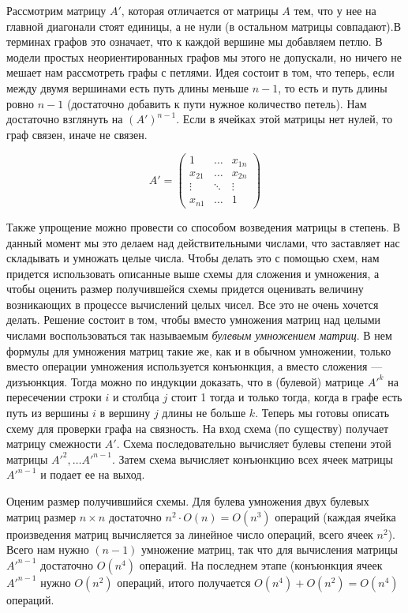 \documentclass[a4paper, 12pt]{article}
\begin{document}
Рассмотрим матрицу $A'$, которая отличается от матрицы $A$ тем, что у нее на главной диагонали стоят единицы, а не нули (в остальном
матрицы совпадают).В терминах графов это означает, что к каждой вершине мы добавляем петлю. В модели простых неориентированных графов мы этого не допускали, но ничего не мешает нам рассмотреть графы с петлями. Идея состоит в том, что теперь, если между двумя вершинами есть путь длины меньше $n - 1$, то есть и путь длины ровно $n - 1$ (достаточно добавить к пути нужное количество петель). Нам достаточно взглянуть на $(A')^{n - 1}$. Если в ячейках этой матрицы нет нулей, то граф связен, иначе не связен. 

\[A' = \begin{pmatrix} 1 & \ldots & x_{1n} \\ x_{21} & \ldots & x_{2n} \\ \vdots & \ddots & \vdots \\ x_{n1} & \ldots & 1 \end{pmatrix}\]

Также упрощение можно провести со способом возведения матрицы в степень. В данный момент мы это делаем над действительными числами, что заставляет нас складывать и умножать целые числа. Чтобы делать это с помощью схем, нам придется использовать описанные выше схемы для сложения и умножения, а чтобы оценить размер получившейся схемы придется оценивать величину возникающих в процессе
вычислений целых чисел. Все это не очень хочется делать. Решение состоит в том, чтобы вместо умножения матриц над целыми числами воспользоваться так называемым \textit{булевым умножением матриц}. В нем формулы для умножения матриц такие же, как и в обычном умножении, только вместо операции умножения используется конъюнкция, а вместо сложения --- дизъюнкция. Тогда можно по индукции доказать, что в (булевой) матрице $A'^k$ на пересечении строки $i$ и столбца $j$ стоит 1 тогда и только тогда, когда в графе есть путь из вершины $i$ в вершину $j$ длины не больше $k$. Теперь мы готовы описать схему для проверки графа на связность. На вход схема
(по существу) получает матрицу смежности $A'$. Схема последовательно вычисляет булевы степени этой матрицы $A'^2, \ldots A'^{n - 1}$. Затем схема вычисляет конъюнкцию всех ячеек матрицы $A'^{n - 1}$ и подает ее на выход. 

Оценим размер получившийся схемы. Для булева умножения двух булевых матриц размер $n \times n$ достаточно $n^2 \cdot O(n) = O(n^3)$ операций (каждая ячейка произведения матриц вычисляется за линейное число операций, всего ячеек $n^2$). Всего нам нужно $(n - 1)$ умножение матриц, так что для вычисления матрицы $A'^{n - 1}$ достаточно $O(n^4)$ операций. На последнем этапе (конъюнкция ячеек $A'^{n - 1}$ нужно $O(n^2)$ операций, итого получается $O(n^4) + O(n^2) = O(n^4)$ операций.
\end{document}
